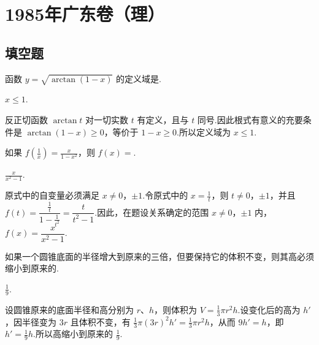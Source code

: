 \chapter{1985年广东卷（理）}

\section{填空题}

\begin{problem}

函数 \(y = \sqrt{\arctan(1 - x)} \) 的定义域是\fillinblank{}.
\end{problem}

\begin{answer}
\(x \leqslant 1\).
\end{answer}

\begin{solution}
反正切函数 \(\arctan t\) 对一切实数 \(t\) 有定义，且与 \(t\) 同号.因此根式有意义的充要条件是 \(\arctan(1-x)\geqslant0\)，等价于 \(1-x\geqslant0\).所以定义域为 \(x\leqslant1\).
\end{solution}

\begin{problem}

如果 \(f\left(\frac{1}{x}\right)=\frac{x}{1-x^{2}} \)，则 \(f(x)= \)\fillinblank{}.
\end{problem}

\begin{answer}
\(\displaystyle \frac{x}{x^{2}-1}\).
\end{answer}

\begin{solution}
原式中的自变量必须满足 \(x\ne0\)，\(\pm1\).令原式中的 \(x=\frac1t\)，则 \(t\ne0\)，\(\pm1\)，并且 \(f(t)=\dfrac{\frac{1}{t}}{1-\frac{1}{t^{2}}}=\dfrac{t}{t^{2}-1}\).因此，在题设关系确定的范围 \(x\ne0\)，\(\pm1\) 内，\(f(x)=\dfrac{x}{x^{2}-1}\).
\end{solution}

\begin{problem}

如果一个圆锥底面的半径增大到原来的三倍，但要保持它的体积不变，则其高必须缩小到原来的\fillinblank{}.
\end{problem}

\begin{answer}
\(\displaystyle \frac{1}{9}\).
\end{answer}

\begin{solution}
设圆锥原来的底面半径和高分别为 \(r\)、\(h\)，则体积为 \(V=\frac13\pi r^{2}h\).设变化后的高为 \(h'\)，因半径变为 \(3r\) 且体积不变，有 \(\frac13\pi(3r)^{2}h'=\frac13\pi r^{2}h\)，从而 \(9h'=h\)，即 \(h'=\frac19h\).所以高缩小到原来的 \(\displaystyle\frac19\).
\end{solution}


